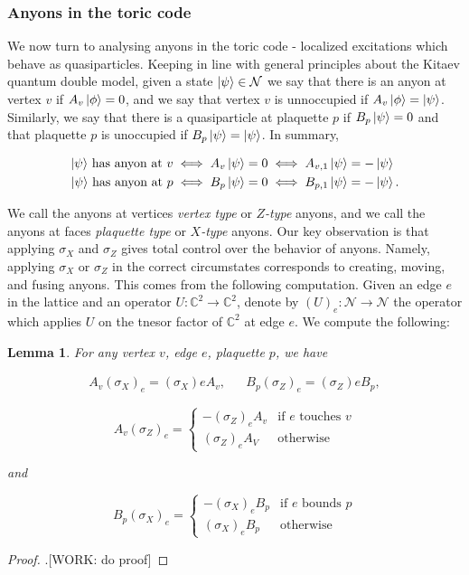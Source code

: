 \documentclass{article}
\newtheorem{lemma}{Lemma}[section]
\theoremstyle{definition}
\newcommand{\CC}{\mathbb{C}}
\newcommand{\NN}{\mathcal{N}}
\newcommand{\0}{\left|0\right>}
\newcommand{\1}{\left|1\right>}
\numberwithin{figure}{section}
\begin{document}
\subsubsection{Anyons in the toric code}

We now turn to analysing anyons in the toric code - localized excitations which behave as quasiparticles. Keeping in line with general principles about the Kitaev quantum double model, given a state $\ket{\psi}\in \NN$ we say that there is an anyon at vertex $v$ if $A_v\ket{\phi}=0$, and we say that vertex $v$ is unnoccupied if $A_v\ket{\phi}=\ket{\psi}$. Similarly, we say that there is a quasiparticle at plaquette $p$ if $B_p\ket{\psi}=0$ and that plaquette $p$ is unoccupied if $B_p\ket{\psi}=\ket{\psi}$. In summary,

\begin{align*}
\text{$\ket{\psi}$ has anyon at $v$}\iff A_v\ket{\psi}&=0 \iff A_{v,1}\ket{\psi}=-\ket{\psi}\\
\text{$\ket{\psi}$ has anyon at $p$}\iff B_p\ket{\psi}&=0 \iff B_{p,1}\ket{\psi}=-\ket{\psi}.
\end{align*}

We call the anyons at vertices \textit{vertex type} or \textit{$Z$-type} anyons, and we call the anyons at faces \textit{plaquette type} or \textit{$X$-type} anyons. Our key observation is that applying $\sigma_X$ and $\sigma_Z$ gives total control over the behavior of anyons. Namely, applying $\sigma_X$ or $\sigma_Z$ in the correct circumstates corresponds to creating, moving, and fusing anyons. This comes from the following computation. Given an edge $e$ in the lattice and an operator $U:\CC^2\to \CC^2$, denote by $(U)_e:\NN\to\NN$ the operator which applies $U$ on the tnesor factor of $\CC^2$ at edge $e$. We compute the following:

\begin{lemma} For any vertex $v$, edge $e$, plaquette $p$, we have

\begin{align*}
A_v  (\sigma_X)_e=(\sigma_X)e A_v, && B_p (\sigma_Z)_e=(\sigma_Z)e B_p,
\end{align*}

\begin{equation*}
A_v (\sigma_Z)_e=
\begin{cases}
- (\sigma_Z)_e A_v & \text{if $e$ touches $v$}\\
(\sigma_Z)_e A_V & \text{otherwise}
\end{cases}
\end{equation*}

and

\begin{equation*}
B_p (\sigma_X)_e=
\begin{cases}
- (\sigma_X)_e B_p & \text{if $e$ bounds $p$}\\
(\sigma_X)_e B_p & \text{otherwise}
\end{cases}
\end{equation*}


\end{lemma}
\begin{proof}.[WORK: do proof]
\end{proof}
\end{document}
